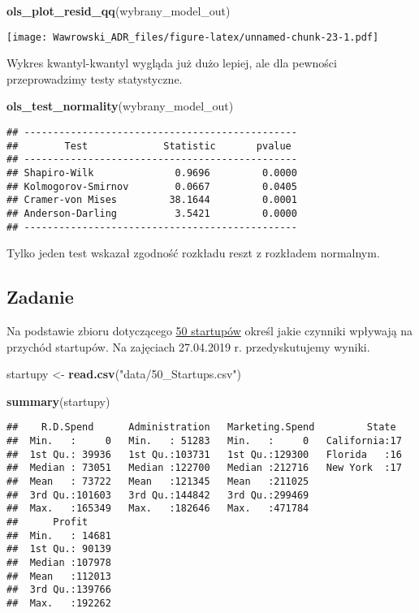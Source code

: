 \documentclass[]{book}
\newenvironment{Shaded}{\begin{snugshade}}{\end{snugshade}}
\newcommand{\KeywordTok}[1]{\textcolor[rgb]{0.13,0.29,0.53}{\textbf{#1}}}
\newcommand{\StringTok}[1]{\textcolor[rgb]{0.31,0.60,0.02}{#1}}
\newcommand{\NormalTok}[1]{#1}
\begin{document}
\begin{Shaded}
\begin{Highlighting}[]
\KeywordTok{ols_plot_resid_qq}\NormalTok{(wybrany_model_out)}
\end{Highlighting}
\end{Shaded}

\texttt{[image: Wawrowski\_ADR\_files/figure-latex/unnamed-chunk-23-1.pdf]}

Wykres kwantyl-kwantyl wygląda już dużo lepiej, ale dla pewności
przeprowadzimy testy statystyczne.

\begin{Shaded}
\begin{Highlighting}[]
\KeywordTok{ols_test_normality}\NormalTok{(wybrany_model_out)}
\end{Highlighting}
\end{Shaded}

\begin{verbatim}
## -----------------------------------------------
##        Test             Statistic       pvalue  
## -----------------------------------------------
## Shapiro-Wilk              0.9696         0.0000 
## Kolmogorov-Smirnov        0.0667         0.0405 
## Cramer-von Mises         38.1644         0.0001 
## Anderson-Darling          3.5421         0.0000 
## -----------------------------------------------
\end{verbatim}

Tylko jeden test wskazał zgodność rozkładu reszt z rozkładem normalnym.

\subsection{Zadanie}\label{zadanie-1}

Na podstawie zbioru dotyczącego \href{data/50_Startups.csv}{50
startupów} określ jakie czynniki wpływają na przychód startupów. Na
zajęciach 27.04.2019 r. przedyskutujemy wyniki.

\begin{Shaded}
\begin{Highlighting}[]
\NormalTok{startupy <-}\StringTok{ }\KeywordTok{read.csv}\NormalTok{(}\StringTok{"data/50_Startups.csv"}\NormalTok{)}

\KeywordTok{summary}\NormalTok{(startupy)}
\end{Highlighting}
\end{Shaded}

\begin{verbatim}
##    R.D.Spend      Administration   Marketing.Spend         State   
##  Min.   :     0   Min.   : 51283   Min.   :     0   California:17  
##  1st Qu.: 39936   1st Qu.:103731   1st Qu.:129300   Florida   :16  
##  Median : 73051   Median :122700   Median :212716   New York  :17  
##  Mean   : 73722   Mean   :121345   Mean   :211025                  
##  3rd Qu.:101603   3rd Qu.:144842   3rd Qu.:299469                  
##  Max.   :165349   Max.   :182646   Max.   :471784                  
##      Profit      
##  Min.   : 14681  
##  1st Qu.: 90139  
##  Median :107978  
##  Mean   :112013  
##  3rd Qu.:139766  
##  Max.   :192262
\end{verbatim}
\end{document}
